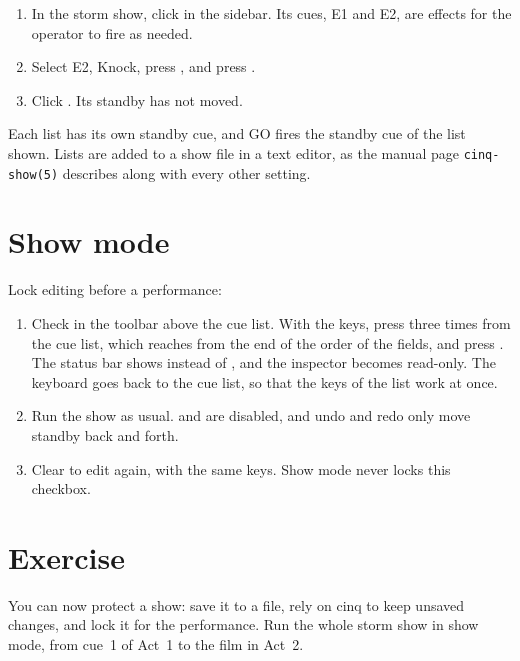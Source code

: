 \begin{enumerate}
\item In the storm show, click  in the sidebar.  Its cues, E1
  and E2, are effects for the operator to fire as needed.
\item Select E2, Knock, press , and press \@.
\item Click .  Its standby has not moved.
\end{enumerate}

Each list has its own standby cue, and GO fires the standby cue of the list
shown.  Lists are added to a show file in a text editor, as the manual page
\texttt{cinq-show(5)} describes along with every other setting.

\section{Show mode}

Lock editing before a performance:

\begin{enumerate}
\item Check  in the toolbar above the cue list.  With the keys,
  press  three times from the cue list, which reaches
   from the end of the order of the fields, and press
  .  The status bar shows  instead of , and the inspector becomes read-only.  The keyboard goes back to the
  cue list, so that the keys of the list work at once.
\item Run the show as usual.   and  are disabled,
  and undo and redo only move standby back and forth.
\item Clear  to edit again, with the same keys.  Show mode never
  locks this checkbox.
\end{enumerate}

\section*{Exercise}

You can now protect a show: save it to a file, rely on cinq to keep unsaved
changes, and lock it for the performance.  Run the whole storm show in show
mode, from cue~1 of Act~1 to the film in Act~2.
